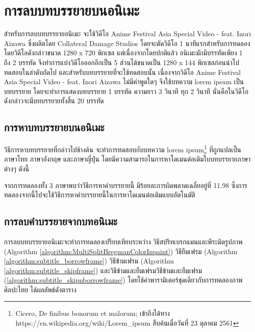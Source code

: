 \section{การลบบทบรรยายบนอนิเมะ}
\hspace{1cm} สำหรับการลบบทบรรยายอนิเมะ จะใช้วิดีโอ Anime Festival Asia Special Video - feat. Inori Aizawa ซึ่งผลิตโดย Collateral Damage Studios โดยจะตัดวิดีโอ 1 นาทีแรกสำหรับการทดลอง โดยวิดีโอดังกล่าวขนาด 1280 x 720 พิกเซล แต่เนื่องจากโดยปกติแล้ว อนิเมะมักมีบรรทัดเพียง 1 ถึง 2 บรรทัด จึงทำการแบ่งวิดีโอออกอีกเป็น 5 ส่วนได้ขนาดเป็น 1280 x 144 พิกเซลก่อนนำไปทดสอบในลำดับถัดไป และสำหรับบทบรรยายที่จะใช้ทดสอบนั้น เนื่องจากวิดีโอ Anime Festival Asia Special Video - feat. Inori Aizawa ไม่มีคำพูดใดๆ จึงใช้บทความ lorem ipsum เป็นบทบรรยาย โดยจะทำการแสดงบทบรรยาย 1 บรรทัด ความยาว 3 วินาที ทุก 2 วินาที นั่นคือในวิดีโอดังกล่าวจะมีบทบรรยายทั้งสิ้น 20 บรรทัด	
	


\subsection{การหาบทบรรยายบนอนิเมะ}	
    
\hspace{1cm} วิธีการหาบทบรรยายที่กล่าวไปข้างต้น จะทำการทดสอบกับบทความ lorem ipsum\footnote{Cicero, De finibus bonorum et malorum; เข้าถึงได้ทาง https://en.wikipedia.org/wiki/Lorem\_ipsum สืบค้นเมื่อวันที่ 23 ตุลาคม 2561} ที่ถูกแปลเป็นภาษาไทย ภาษาอังกฤษ และภาษาญี่ปุ่น โดยมีความสามารถในการหาโดเมนต่อเติมใบบทบรรยายภาษาต่างๆ ดังนี้


	

\hspace{1cm} จากการทดลองทั้ง  3 ภาษาพบว่าวิธีการหาคำบรรยายนี้ มีร้อยละการผิดพลาดเฉลี่ยอยู่ที่ 11.98 ซึ่งการทดลองจากนี้ไปจะใช้วิธีการหาคำบรรยายนี้ในการหาโดเมนต่อเติมแบบอัตโนมัติ

\subsection{การลบคำบรรยายจากบทอนิเมะ}

\hspace{1cm} การลบบทบรรยายอนิเมะจะทำการทดลองเปรียบเทียบระหว่าง วิธีสปริทเบรกแมนและพีระมิดรูปภาพ (Algorithm \ref{algorithm:MultiSplitBregmanColorInpaint}) วิธียืมเฟรม (Algorithm \ref{algorithm:subtitle_borrowframe}) วิธีข้ามเฟรม (Algorithm \ref{algorithm:subtitle_skipframe}) และวิธีข้ามและยืมเฟรมวิธีข้ามและยืมเฟรม (\ref{algorithm:subtitle_skipnborrowframe}) โดยใช้ค่าพารามิเตอร์ชุดเดียวกับการทดลองภาพศิลปะไทย ได้ผลลัพธ์ดังตาราง 

